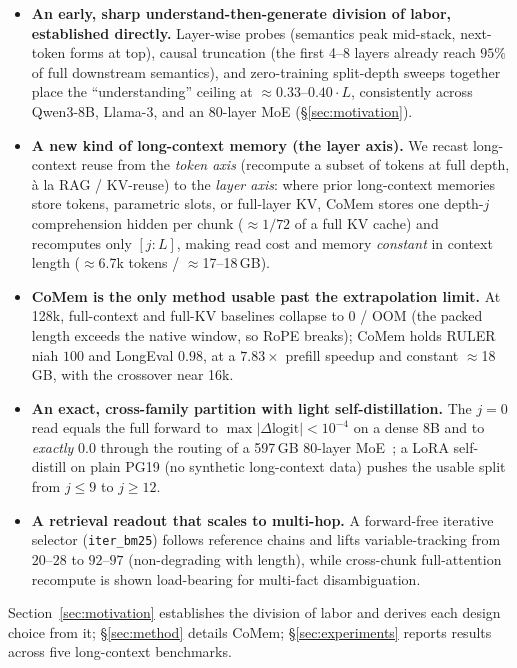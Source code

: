 \begin{itemize}[leftmargin=1.2em,itemsep=2pt]
\item \textbf{An early, sharp understand-then-generate division of labor,
established directly.} Layer-wise probes (semantics peak mid-stack, next-token
forms at top), causal truncation (the first 4--8 layers already reach $95\%$ of
full downstream semantics), and zero-training split-depth sweeps together place
the ``understanding'' ceiling at $\approx$$0.33$--$0.40\cdot L$, consistently
across Qwen3-8B, Llama-3, and an 80-layer MoE (\S\ref{sec:motivation}).
\item \textbf{A new kind of long-context memory (the layer axis).} We recast
long-context reuse from the \emph{token axis} (recompute a subset of tokens at
full depth, \`{a} la RAG / KV-reuse) to the \emph{layer axis}: where prior
long-context memories store tokens, parametric slots, or full-layer KV, CoMem
stores one depth-$j$ comprehension hidden per chunk ($\approx$$1/72$ of a full
KV cache) and recomputes only $[j{:}L]$, making read cost and memory
\emph{constant} in context length ($\approx$6.7k tokens / $\approx$17--18\,GB).
\item \textbf{CoMem is the only method usable past the extrapolation limit.} At
128k, full-context and full-KV baselines collapse to $0$ / OOM (the packed
length exceeds the native window, so RoPE breaks); CoMem holds RULER niah $100$
and LongEval $0.98$, at a $7.83\times$ prefill speedup and constant
$\approx$18\,GB, with the crossover near 16k.
\item \textbf{An exact, cross-family partition with light self-distillation.}
The $j{=}0$ read equals the full forward to $\max|\Delta\text{logit}|<10^{-4}$
on a dense 8B and to \emph{exactly} $0.0$ through the routing of a 597\,GB
80-layer MoE~\citep{hunyuan}; a LoRA self-distill on plain PG19 (no synthetic
long-context data) pushes the usable split from $j{\le}9$ to $j{\ge}12$.
\item \textbf{A retrieval readout that scales to multi-hop.} A forward-free
iterative selector (\texttt{iter\_bm25}) follows reference chains and lifts
variable-tracking from $20$--$28$ to $92$--$97$ (non-degrading with length),
while cross-chunk full-attention recompute is shown load-bearing for multi-fact
disambiguation.
\end{itemize}
Section~\ref{sec:motivation} establishes the division of labor and derives each
design choice from it; \S\ref{sec:method} details CoMem; \S\ref{sec:experiments}
reports results across five long-context benchmarks.
